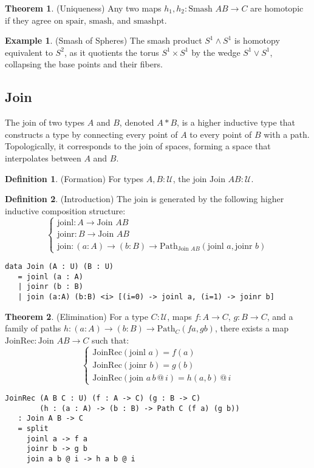 \documentclass{article}
\theoremstyle{definition}
\newtheorem{theorem}{Theorem}
\newtheorem{definition}{Definition}
\newtheorem{example}{Example}
\begin{document}
\begin{theorem} (Uniqueness)
Any two maps $h_1, h_2 : \text{Smash } A B \to C$ are homotopic if they agree on $\text{spair}$, $\text{smash}$, and $\text{smashpt}$.
\end{theorem}

\begin{example} (Smash of Spheres)
The smash product $S^1 \wedge S^1$ is homotopy equivalent to $S^2$, as it quotients the torus $S^1 \times S^1$ by the wedge $S^1 \vee S^1$, collapsing the base points and their fibers.
\end{example}

\newpage
\subsection{Join}
The join of two types $A$ and $B$, denoted $A * B$, is a higher inductive type that constructs a type by connecting every point of $A$ to every point of $B$ with a path. Topologically, it corresponds to the join of spaces, forming a space that interpolates between $A$ and $B$.

\begin{definition} (Formation)
For types $A, B : \mathcal{U}$, the join $\text{Join } A B : \mathcal{U}$.
\end{definition}

\begin{definition} (Introduction)
The join is generated by the following higher inductive composition structure:
\[
\begin{cases}
\text{joinl} : A \to \text{Join } A B \\
\text{joinr} : B \to \text{Join } A B \\
\text{join} : (a : A) \to (b : B) \to \text{Path}_{\text{Join } A B} (\text{joinl } a, \text{joinr } b)
\end{cases}
\]
\begin{lstlisting}
data Join (A : U) (B : U)
   = joinl (a : A)
   | joinr (b : B)
   | join (a:A) (b:B) <i> [(i=0) -> joinl a, (i=1) -> joinr b]
\end{lstlisting}
\end{definition}

\begin{theorem} (Elimination)
For a type $C : \mathcal{U}$, maps $f : A \to C$, $g : B \to C$, and a family of paths $h : (a : A) \to (b : B) \to \text{Path}_C (f a, g b)$, there exists a map $\text{JoinRec} : \text{Join } A B \to C$ such that:
\[
\begin{cases}
\text{JoinRec}(\text{joinl } a) = f(a) \\
\text{JoinRec}(\text{joinr } b) = g(b) \\
\text{JoinRec}(\text{join } a \, b \, @ \, i) = h(a, b) \, @ \, i
\end{cases}
\]
\begin{lstlisting}
JoinRec (A B C : U) (f : A -> C) (g : B -> C)
        (h : (a : A) -> (b : B) -> Path C (f a) (g b))
   : Join A B -> C
   = split
     joinl a -> f a
     joinr b -> g b
     join a b @ i -> h a b @ i
\end{lstlisting}
\end{theorem}
\end{document}
